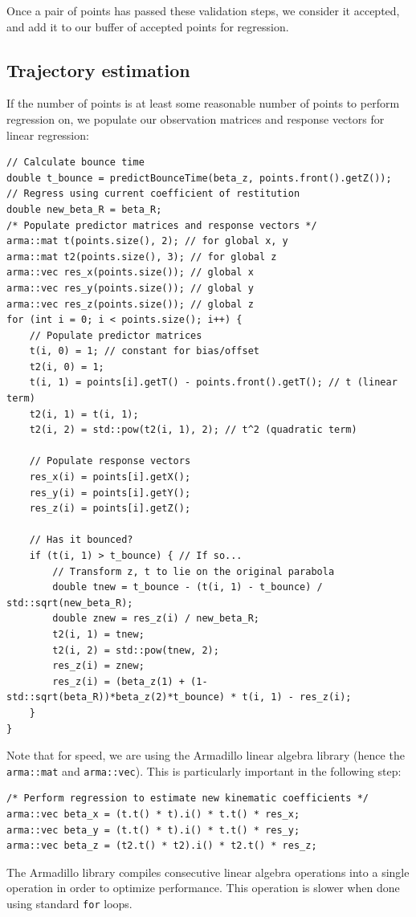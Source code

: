 \documentclass[letterpaper, 11pt]{article}
\begin{document}
\begin{enumerate}[label=\textbf{\arabic*.}]
Once a pair of points has passed these validation steps, we consider it accepted, and add it to our buffer of accepted points for regression.

\subsection{Trajectory estimation}
If the number of points is at least some reasonable number of points to perform regression on, we populate our observation matrices and response vectors for linear regression:
\begin{verbatim}
// Calculate bounce time
double t_bounce = predictBounceTime(beta_z, points.front().getZ());
// Regress using current coefficient of restitution
double new_beta_R = beta_R;
/* Populate predictor matrices and response vectors */
arma::mat t(points.size(), 2); // for global x, y
arma::mat t2(points.size(), 3); // for global z
arma::vec res_x(points.size()); // global x
arma::vec res_y(points.size()); // global y
arma::vec res_z(points.size()); // global z
for (int i = 0; i < points.size(); i++) {
    // Populate predictor matrices
    t(i, 0) = 1; // constant for bias/offset
    t2(i, 0) = 1;
    t(i, 1) = points[i].getT() - points.front().getT(); // t (linear term)
    t2(i, 1) = t(i, 1);
    t2(i, 2) = std::pow(t2(i, 1), 2); // t^2 (quadratic term)

    // Populate response vectors
    res_x(i) = points[i].getX();
    res_y(i) = points[i].getY();
    res_z(i) = points[i].getZ();

    // Has it bounced?
    if (t(i, 1) > t_bounce) { // If so...
        // Transform z, t to lie on the original parabola
        double tnew = t_bounce - (t(i, 1) - t_bounce) / std::sqrt(new_beta_R);
        double znew = res_z(i) / new_beta_R;
        t2(i, 1) = tnew;
        t2(i, 2) = std::pow(tnew, 2);
        res_z(i) = znew;
        res_z(i) = (beta_z(1) + (1-std::sqrt(beta_R))*beta_z(2)*t_bounce) * t(i, 1) - res_z(i);
    }
}
\end{verbatim}

Note that for speed, we are using the Armadillo linear algebra library (hence the \verb|arma::mat| and \verb|arma::vec|). This is particularly important in the following step:
\begin{verbatim}
/* Perform regression to estimate new kinematic coefficients */
arma::vec beta_x = (t.t() * t).i() * t.t() * res_x;
arma::vec beta_y = (t.t() * t).i() * t.t() * res_y;
arma::vec beta_z = (t2.t() * t2).i() * t2.t() * res_z;
\end{verbatim}
The Armadillo library compiles consecutive linear algebra operations into a single operation in order to optimize performance. This operation is slower when done using standard \texttt{for} loops.


\end{enumerate}
\end{document}
